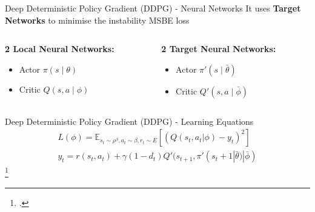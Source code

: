 \documentclass[aspectratio=169]{beamer}
\begin{document}
\begin{frame}{Deep Deterministic Policy Gradient (DDPG) - Neural Networks}
	\centering
	It uses \textbf{Target Networks} to minimise the instability MSBE loss
	\vspace{10mm}
	\begin{columns}
		\begin{column}{0.5\linewidth}
			\textbf{2 Local Neural Networks:}
			\begin{itemize}
				\item Actor $\pi(s \;|\; \theta)$ 
				\item Critic $Q(s, a \;|\; \phi)$
			\end{itemize}
		\end{column}
		\begin{column}{0.5\textwidth}
			\textbf{2 Target Neural Networks:}
			\begin{itemize}
				\item Actor $\pi'(s \;|\; \bar{\theta})$
				\item Critic $Q'(s, a \;|\; \bar{\phi})$
			\end{itemize}
		\end{column}
	\end{columns}
\end{frame}

\begin{frame}{Deep Deterministic Policy Gradient (DDPG) - Learning Equations}
	\centering
	\Large
	\begin{equation}\label{eq:ddpgloss}
	\begin{gathered}
	L(\phi) = \mathbb{E}_{s_t\sim \rho^\beta, a_t\sim \beta,r_t\sim E}[(Q(s_t, a_t|\phi)-y_t)^2] \\
	y_t = r(s_t, a_t) + \gamma (1-d_t)Q'(s_{t+1}, \pi'(s_t+1|\bar{\theta})|\bar{\phi})
	\end{gathered}
	\end{equation}
	\footcite*{lillicrap2015continuous}
\end{frame}
\end{document}
